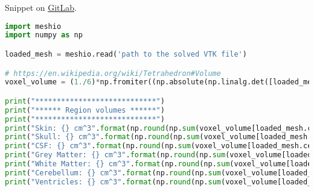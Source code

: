\noindent Snippet on \href{https://gitlab.com/ttis-simulations/ttis-software/-/snippets/2072723}{GitLab}.
\begin{lstlisting}[language=Python,caption={Region volume calculation},captionpos=b,label=lst:region_volume_calc]
import meshio
import numpy as np

loaded_mesh = meshio.read('path to the solved VTK file')

# https://en.wikipedia.org/wiki/Tetrahedron#Volume
voxel_volume = (1./6)*np.fromiter((np.absolute(np.linalg.det([loaded_mesh.points[cell[0]] - loaded_mesh.points[cell[3]], loaded_mesh.points[cell[1]] - loaded_mesh.points[cell[3]], loaded_mesh.points[cell[2]] - loaded_mesh.points[cell[3]]])) for cell in loaded_mesh.cells[0][1]), dtype=np.float32)

print("****************************")
print("****** Region volumes ******")
print("****************************")
print("Skin: {} cm^3".format(np.round(np.sum(voxel_volume[loaded_mesh.cell_data['mat_id'][0] == 1])/1000, 2)))
print("Skull: {} cm^3".format(np.round(np.sum(voxel_volume[loaded_mesh.cell_data['mat_id'][0] == 2])/1000, 2)))
print("CSF: {} cm^3".format(np.round(np.sum(voxel_volume[loaded_mesh.cell_data['mat_id'][0] == 3])/1000, 2)))
print("Grey Matter: {} cm^3".format(np.round(np.sum(voxel_volume[loaded_mesh.cell_data['mat_id'][0] == 4])/1000, 2)))
print("White Matter: {} cm^3".format(np.round(np.sum(voxel_volume[loaded_mesh.cell_data['mat_id'][0] == 5])/1000, 2)))
print("Cerebellum: {} cm^3".format(np.round(np.sum(voxel_volume[loaded_mesh.cell_data['mat_id'][0] == 6])/1000, 2)))
print("Ventricles: {} cm^3".format(np.round(np.sum(voxel_volume[loaded_mesh.cell_data['mat_id'][0] == 7])/1000, 2)))
\end{lstlisting}
